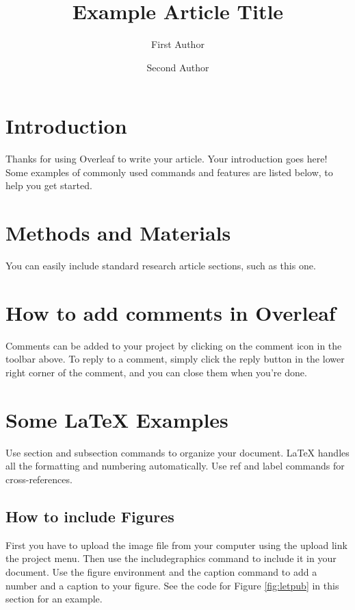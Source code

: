 \documentclass[fleqn,10pt]{olplainarticle}
\title{Example Article Title}
\author[1]{First Author}
\author[2]{Second Author}
\affil[1]{Address of first author}
\affil[2]{Address of second author}
\begin{document}
\flushbottom
\maketitle
\thispagestyle{empty}

\section*{Introduction}

Thanks for using Overleaf to write your article. Your introduction goes here! Some examples of commonly used commands and features are listed below, to help you get started.

\section*{Methods and Materials}

You can easily include standard research article sections, such as this one.

\section*{How to add comments in Overleaf}

Comments can be added to your project by clicking on the comment icon in the toolbar above. %
%
%
To reply to a comment, simply click the reply button in the lower right corner of the comment, and you can close them when you're done.

\section*{Some \LaTeX{} Examples}
\label{sec:examples}

Use section and subsection commands to organize your document. \LaTeX{} handles all the formatting and numbering automatically. Use ref and label commands for cross-references.

\subsection*{How to include Figures}

First you have to upload the image file from your computer using the upload link the project menu. Then use the includegraphics command to include it in your document. Use the figure environment and the caption command to add a number and a caption to your figure. See the code for Figure \ref{fig:letpub} in this section for an example.
\end{document}

